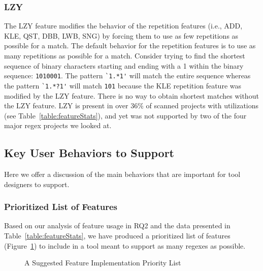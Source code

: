 \subsubsection{LZY}
The LZY feature modifies the behavior of the repetition features (i.e., ADD, KLE, QST, DBB, LWB, SNG) by forcing them to use as few repetitions as possible for a match.  The default behavior for the repetition features is to use as many repetitions as possible for a match.  Consider trying to find the shortest sequence of binary characters starting and ending with a 1 within the binary sequence: {\tt 1010001}. The pattern \verb!`1.*1'! will match the entire sequence whereas the pattern \verb!`1.*?1'! will match {\tt 101} because the KLE repetition feature was modified by the LZY feature.  There is no way to obtain shortest matches without the LZY feature.  LZY is present in over 36\% of scanned projects with utilizations (see Table~\ref{table:featureStats}), and yet was not supported by two of the four major regex projects we looked at.

\subsection{Key User Behaviors to Support}
Here we offer a discussion of the main behaviors that are important for tool designers to support.

\subsubsection{Prioritized List of Features}
\label{sec:prioritizedList}
Based on our analysis of feature usage in RQ2 and the data presented in Table~\ref{table:featureStats}, we have produced a prioritized list of features (Figure~\ref{fig:prioritizedList}) to include in a tool meant to support as many regexes as possible.

\begin{figure}[tb]
\caption{A Suggested Feature Implementation Priority List \label{fig:prioritizedList}
}
\end{figure}


